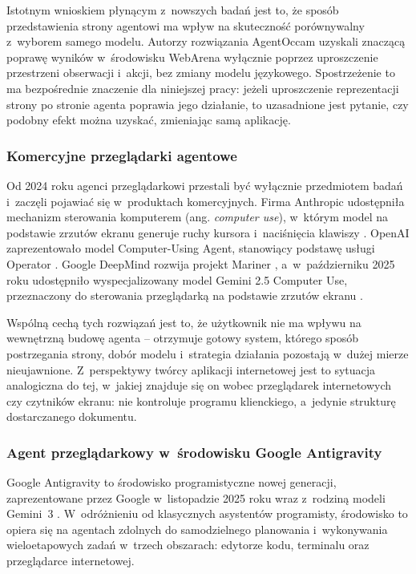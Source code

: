 Istotnym wnioskiem płynącym z~nowszych badań jest to, że sposób przedstawienia strony agentowi ma wpływ na skuteczność porównywalny z~wyborem samego modelu. Autorzy rozwiązania AgentOccam \citep{yang2025agentoccam} uzyskali znaczącą poprawę wyników w~środowisku WebArena wyłącznie poprzez uproszczenie przestrzeni obserwacji i~akcji, bez zmiany modelu językowego. Spostrzeżenie to ma bezpośrednie znaczenie dla niniejszej pracy: jeżeli uproszczenie reprezentacji strony po stronie agenta poprawia jego działanie, to uzasadnione jest pytanie, czy podobny efekt można uzyskać, zmieniając samą aplikację.

\subsubsection{Komercyjne przeglądarki agentowe}
Od 2024 roku agenci przeglądarkowi przestali być wyłącznie przedmiotem badań i~zaczęli pojawiać się w~produktach komercyjnych. Firma Anthropic udostępniła mechanizm sterowania komputerem (ang. \textit{computer use}), w~którym model na podstawie zrzutów ekranu generuje ruchy kursora i~naciśnięcia klawiszy \citep{anthropic2024computeruse}. OpenAI zaprezentowało model Computer-Using Agent, stanowiący podstawę usługi Operator \citep{openai2025cua}. Google DeepMind rozwija projekt Mariner \citep{google2024mariner}, a~w~październiku 2025 roku udostępniło wyspecjalizowany model Gemini 2.5 Computer Use, przeznaczony do sterowania przeglądarką na podstawie zrzutów ekranu \citep{google2025computeruse}.

Wspólną cechą tych rozwiązań jest to, że użytkownik nie ma wpływu na wewnętrzną budowę agenta -- otrzymuje gotowy system, którego sposób postrzegania strony, dobór modelu i~strategia działania pozostają w~dużej mierze nieujawnione. Z~perspektywy twórcy aplikacji internetowej jest to sytuacja analogiczna do tej, w~jakiej znajduje się on wobec przeglądarek internetowych czy czytników ekranu: nie kontroluje programu klienckiego, a~jedynie strukturę dostarczanego dokumentu.

\subsubsection{Agent przeglądarkowy w~środowisku Google Antigravity}
\label{sec:antigravity}
Google Antigravity to środowisko programistyczne nowej generacji, zaprezentowane przez Google w~listopadzie 2025 roku wraz z~rodziną modeli Gemini~3 \citep{google2025antigravityblog}. W~odróżnieniu od klasycznych asystentów programisty, środowisko to opiera się na agentach zdolnych do samodzielnego planowania i~wykonywania wieloetapowych zadań w~trzech obszarach: edytorze kodu, terminalu oraz przeglądarce internetowej.

